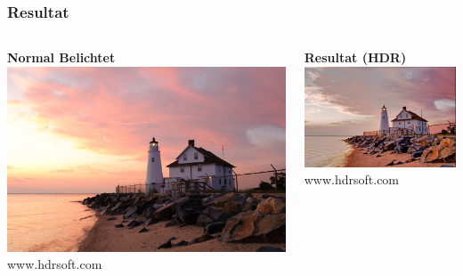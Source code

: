 \documentclass{beamer}
\begin{document}
	\begin{frame}
	\frametitle{Resultat}
	\begin{columns}
		\begin{column}{0.5\textwidth}
			\begin{center}
				\textbf{Normal Belichtet} \\ 
				\vspace{5mm}
				\includegraphics[scale=0.42]{img/bild13.jpg}
				\tiny www.hdrsoft.com
			\end{center}
		\end{column}
		\begin{column}{0.5\textwidth}
			\begin{center}
				\textbf{Resultat (HDR)} \\ 
				\vspace{5mm}
				\includegraphics[scale=0.42]{img/bild14.png}
				\tiny www.hdrsoft.com
			\end{center}
		\end{column}
	\end{columns}
	\end{frame}
\end{document}

